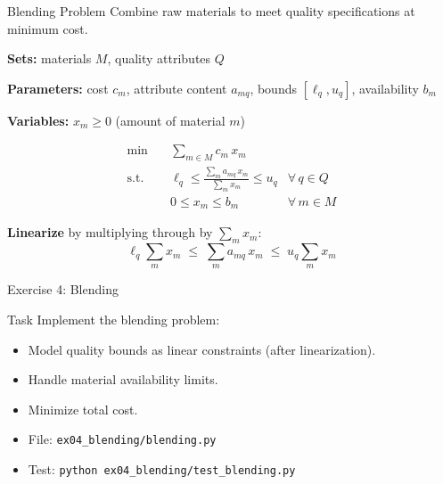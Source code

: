 \documentclass[aspectratio=169,10pt]{beamer}
\begin{document}
\begin{frame}{Blending Problem}
Combine raw materials to meet quality specifications at minimum cost.

\medskip
\textbf{Sets:} materials $M$, quality attributes $Q$

\textbf{Parameters:} cost $c_m$, attribute content $a_{mq}$,
bounds $[\ell_q, u_q]$, availability $b_m$

\textbf{Variables:} $x_m \ge 0$ (amount of material $m$)

\begin{align*}
  \min \quad & \sum_{m \in M} c_m \, x_m \\
  \text{s.t.} \quad
    & \ell_q \le \frac{\sum_{m} a_{mq}\, x_m}{\sum_{m} x_m} \le u_q
      & \forall\, q \in Q \\
    & 0 \le x_m \le b_m & \forall\, m \in M
\end{align*}

\medskip
\textbf{Linearize} by multiplying through by $\sum_m x_m$:
\[
  \ell_q \sum_{m} x_m \;\le\; \sum_{m} a_{mq}\, x_m
  \;\le\; u_q \sum_{m} x_m
\]
\end{frame}

\begin{frame}{Exercise 4: Blending}
\begin{block}{Task}
Implement the blending problem:
\begin{itemize}
  \item Model quality bounds as linear constraints (after linearization).
  \item Handle material availability limits.
  \item Minimize total cost.
\end{itemize}
\end{block}
\begin{itemize}
  \item File: \texttt{ex04\_blending/blending.py}
  \item Test: \texttt{python ex04\_blending/test\_blending.py}
\end{itemize}
\end{frame}
\end{document}
